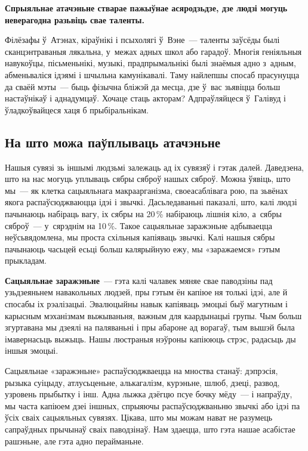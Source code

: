 \textbf{Спрыяльнае атачэньне стварае пажыўнае асяродзьдзе, дзе людзі могуць неверагодна разьвіць свае таленты.}

Філёзафы ў~Атэнах, кіраўнікі і псыхолягі ў~Вэне~--- таленты заўсёды былі сканцэнтраваныя лякальна, у~межах адных школ або гарадоў. Многія геніяльныя навукоўцы, пісьменьнікі, музыкі, прадпрымальнікі былі знаёмыя адно з~адным, абменьваліся ідэямі і шчыльна камунікавалі. Таму найлепшы спосаб прасунуцца да сваёй мэты~--- быць фізычна бліжэй да месца, дзе ў~вас зьявіцца больш настаўнікаў і аднадумцаў. Хочаце стаць акторам? Адпраўляйцеся ў~Галівуд і ўладкоўвайцеся хаця б прыбіральнікам.

\subsection*{На што можа паўплываць атачэньне}

Нашыя сувязі зь іншымі людзьмі залежаць ад іх сувязяў і гэтак далей. Даведзена, што на нас могуць уплываць сябры сяброў нашых сяброў. Можна ўявіць, што мы~--- як клетка сацыяльнага макраарганізма, своеасаблівага рою, па зьвёнах якога распаўсюджваюцца ідэі і звычкі. Дасьледаваньні паказалі, што, калі людзі пачынаюць набіраць вагу, іх сябры на 20\,\% набіраюць лішнія кіло, а~сябры сяброў~--- у~сярэднім на 10\,\%. Такое сацыяльнае заражэньне адбываецца неўсьвядомлена, мы проста схільныя капіяваць звычкі. Калі нашыя сябры пачынаюць часьцей есьці больш калярыйную ежу, мы «заражаемся» гэтым прыкладам.

\textbf{Сацыяльнае заражэньне}~--- гэта калі чалавек мяняе свае паводзіны пад узьдзеяньнем навакольных людзей, пры гэтым ён капіюе ня толькі ідэі, але й спосабы іх рэалізацыі. Эвалюцыйны навык капіяваць эмоцыі быў магутным і карысным мэханізмам выжываньня, важным для каардынацыі групы. Чым больш згуртавана мы дзеялі на паляваньні і пры абароне ад ворагаў, тым вышэй была імавернасьць выжыць. Нашы люстраныя нэўроны капіююць стрэс, радасьць ды іншыя эмоцыі.


Сацыяльнае «заражэньне» распаўсюджваецца на мноства станаў: дэпрэсія, рызыка суіцыду, атлусьценьне, алькагалізм, курэньне, шлюб, дзеці, развод, узровень прыбытку і інш. Адна лыжка дзёгцю псуе бочку мёду~--- і напраўду, мы часта капіюем дзеі іншных, спрыяючы распаўсюджваньню звычкі або ідэі па ўсіх сваіх сацыяльных сувязях. Цікава, што мы можам нават не разумець сапраўдных прычынаў сваіх паводзінаў. Нам здаецца, што гэта нашае асабістае рашэньне, але гэта адно перайманьне.

